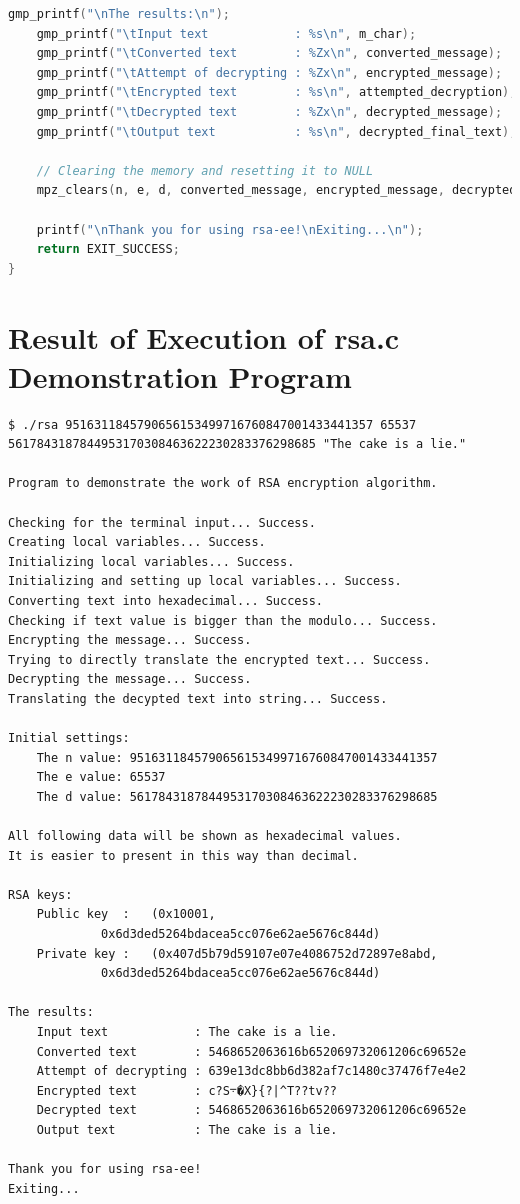 \documentclass[a4paper, 12pt]{article}
\begin{document}
\begin{lstlisting}[language=C, caption=Source Code of rsa.c]
    gmp_printf("\nThe results:\n");
    gmp_printf("\tInput text            : %s\n", m_char);
    gmp_printf("\tConverted text        : %Zx\n", converted_message);
    gmp_printf("\tAttempt of decrypting : %Zx\n", encrypted_message);
    gmp_printf("\tEncrypted text        : %s\n", attempted_decryption);
    gmp_printf("\tDecrypted text        : %Zx\n", decrypted_message);
    gmp_printf("\tOutput text           : %s\n", decrypted_final_text);
    
    // Clearing the memory and resetting it to NULL
    mpz_clears(n, e, d, converted_message, encrypted_message, decrypted_message, NULL);
    
    printf("\nThank you for using rsa-ee!\nExiting...\n");
    return EXIT_SUCCESS;
}
\end{lstlisting}

\newpage

\section{Result of Execution of rsa.c Demonstration Program}
\label{result}
\begin{lstlisting}[caption=Output from the Execution of rsa.c]
$ ./rsa 9516311845790656153499716760847001433441357 65537 5617843187844953170308463622230283376298685 "The cake is a lie."

Program to demonstrate the work of RSA encryption algorithm.

Checking for the terminal input... Success.
Creating local variables... Success.
Initializing local variables... Success.
Initializing and setting up local variables... Success.
Converting text into hexadecimal... Success.
Checking if text value is bigger than the modulo... Success.
Encrypting the message... Success.
Trying to directly translate the encrypted text... Success.
Decrypting the message... Success.
Translating the decypted text into string... Success.

Initial settings:
	The n value: 9516311845790656153499716760847001433441357
	The e value: 65537
	The d value: 5617843187844953170308463622230283376298685

All following data will be shown as hexadecimal values.
It is easier to present in this way than decimal.

RSA keys:
	Public key  :   (0x10001, 
			 0x6d3ded5264bdacea5cc076e62ae5676c844d)
	Private key :   (0x407d5b79d59107e07e4086752d72897e8abd, 
			 0x6d3ded5264bdacea5cc076e62ae5676c844d)

The results:
	Input text            : The cake is a lie.
	Converted text        : 5468652063616b652069732061206c69652e
	Attempt of decrypting : 639e13dc8bb6d382af7c1480c37476f7e4e2
	Encrypted text        : c?S܋�X}{?|^T??tv??
	Decrypted text        : 5468652063616b652069732061206c69652e
	Output text           : The cake is a lie.

Thank you for using rsa-ee!
Exiting...

\end{lstlisting}
\end{document}
